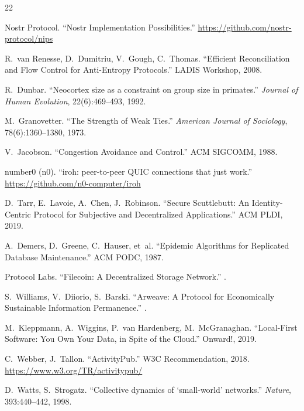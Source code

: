 \documentclass[11pt,a4paper]{article}
\begin{document}
\begin{thebibliography}{22}

Nostr Protocol.
\newblock ``Nostr Implementation Possibilities.''
\newblock \url{https://github.com/nostr-protocol/nips}

R.~van Renesse, D.~Dumitriu, V.~Gough, C.~Thomas.
\newblock ``Efficient Reconciliation and Flow Control for Anti-Entropy Protocols.''
\newblock LADIS Workshop, 2008.

R.~Dunbar.
\newblock ``Neocortex size as a constraint on group size in primates.''
\newblock \emph{Journal of Human Evolution}, 22(6):469--493, 1992.

M.~Granovetter.
\newblock ``The Strength of Weak Ties.''
\newblock \emph{American Journal of Sociology}, 78(6):1360--1380, 1973.

V.~Jacobson.
\newblock ``Congestion Avoidance and Control.''
\newblock ACM SIGCOMM, 1988.

number0 (n0).
\newblock ``iroh: peer-to-peer QUIC connections that just work.''
\newblock \url{https://github.com/n0-computer/iroh}

D.~Tarr, E.~Lavoie, A.~Chen, J.~Robinson.
\newblock ``Secure Scuttlebutt: An Identity-Centric Protocol for Subjective and Decentralized Applications.''
\newblock ACM PLDI, 2019.

A.~Demers, D.~Greene, C.~Hauser, et~al.
\newblock ``Epidemic Algorithms for Replicated Database Maintenance.''
\newblock ACM PODC, 1987.

Protocol Labs.
\newblock ``Filecoin: A Decentralized Storage Network.''
.

S.~Williams, V.~Diiorio, S.~Barski.
\newblock ``Arweave: A Protocol for Economically Sustainable Information Permanence.''
.

M.~Kleppmann, A.~Wiggins, P.~van Hardenberg, M.~McGranaghan.
\newblock ``Local-First Software: You Own Your Data, in Spite of the Cloud.''
\newblock Onward!, 2019.

C.~Webber, J.~Tallon.
\newblock ``ActivityPub.''
\newblock W3C Recommendation, 2018.
\newblock \url{https://www.w3.org/TR/activitypub/}

D.~Watts, S.~Strogatz.
\newblock ``Collective dynamics of `small-world' networks.''
\newblock \emph{Nature}, 393:440--442, 1998.


\end{thebibliography}
\end{document}
